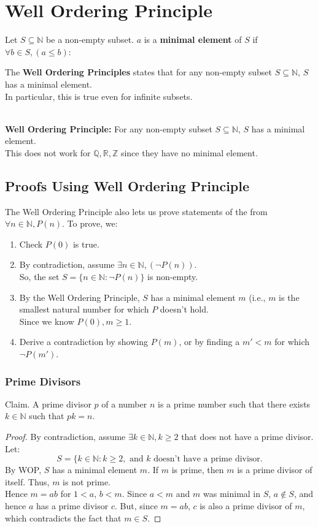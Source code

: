 \documentclass{article}
\begin{document}
\section{Well Ordering Principle}
Let $S \subseteq \mathbb{N}$ be a non-empty subset. $a$ is a \textbf{minimal element} of $S$ if $\forall b \in S, (a \leq b)$:
\begin{center}
     The \textbf{Well Ordering Principles} states that for any non-empty subset $S \subseteq \mathbb{N}$, $S$ has a minimal element.\\
In particular, this is true even for infinite subsets.
\end{center}
\\
\textbf{Well Ordering Principle: }For any non-empty subset $S \subseteq \mathbb{N}$, $S$ has a minimal element.\\
This does not work for $\mathbb{Q}, \mathbb{R}, \mathbb{Z}$ since they have no minimal element.

\subsection{Proofs Using Well Ordering Principle}
The Well Ordering Principle also lets us prove statements of the from $\forall n \in \mathbb{N}, P(n)$. To prove, we:
\begin{enumerate}
    \item Check $P(0)$ is true.
    \item By contradiction, assume $\exists n \in \mathbb{N}, (\neg P(n))$.\\
    So, the set $S = \{n \in \mathbb{N} : \neg P(n)\}$ is non-empty.
    \item By the Well Ordering Principle, $S$ has a minimal element $m$ (i.e., $m$ is the smallest natural number for which $P$ doesn't hold.\\
    Since we know $P(0), m \geq 1$.
    \item Derive a contradiction by showing $P(m)$, or by finding a $m' < m$ for which $\neg P(m')$.
\end{enumerate}

\subsubsection{Prime Divisors}
Claim. A prime divisor $p$ of a number $n$ is a prime number such that there exists $k \in \mathbb{N}$ such that $pk = n$.
\begin{proof}
By contradiction, assume $\exists k \in \mathbb{N}, k \geq 2$ that does not have a prime divisor. Let:
$$S = \{ k \in \mathbb{N} : k \geq 2, \text{ and } k \text{ doesn't have a prime divisor.} $$
By WOP, $S$ has a minimal element $m$. If $m$ is prime, then $m$ is a prime divisor of itself. Thus, $m$ is not prime.\\
Hence $m = ab$ for $1 < a$, $b < m$. Since $a < m$ and $m$ was minimal in $S$, $a \not\in S$, and hence $a$ has a prime divisor $c$. But, since $m = ab$, $c$ is also a prime divisor of $m$, which contradicts the fact that $m \in S$.
\end{proof}
\end{document}
